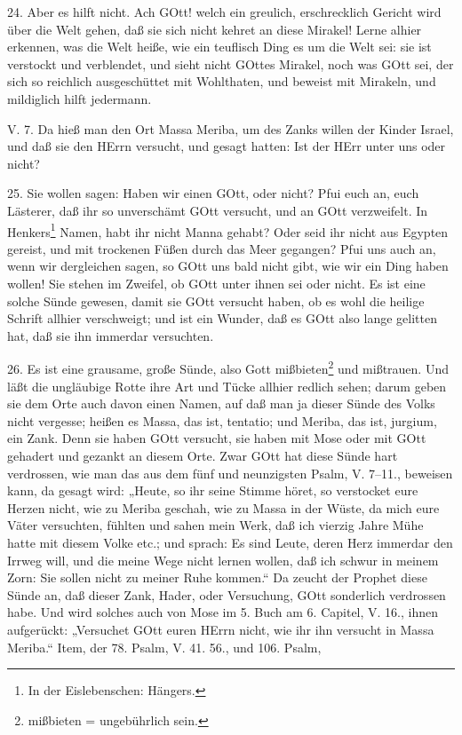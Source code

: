 24. Aber es hilft nicht. Ach GOtt! welch ein greulich, erschrecklich Gericht wird über die Welt gehen, daß sie sich nicht kehret an diese Mirakel! Lerne alhier erkennen, was die Welt heiße, wie ein teuflisch Ding es um die Welt sei: sie ist verstockt und verblendet, und sieht nicht GOttes Mirakel, noch was GOtt sei, der sich so reichlich ausgeschüttet mit Wohlthaten, und beweist mit Mirakeln, und mildiglich hilft jedermann.

\begin{schriftzitat}
V. 7. Da hieß man den Ort Massa Meriba, um des Zanks willen der Kinder Israel, und daß sie den HErrn versucht, und gesagt hatten: Ist der HErr unter uns oder nicht?
\end{schriftzitat}

25. Sie wollen sagen: Haben wir einen GOtt, oder nicht? Pfui euch an, euch Lästerer, daß ihr so unverschämt GOtt versucht, und an GOtt verzweifelt. In Henkers\footnote{In der Eislebenschen: Hängers.} Namen, habt ihr nicht Manna gehabt? Oder seid ihr nicht aus Egypten gereist, und mit trockenen Füßen durch das Meer gegangen? Pfui uns auch an, wenn wir dergleichen sagen, so GOtt uns bald nicht gibt, wie wir ein Ding haben wollen! Sie stehen im Zweifel, ob GOtt unter ihnen sei oder nicht. Es ist eine solche Sünde gewesen, damit sie GOtt versucht haben, ob es wohl die heilige Schrift allhier verschweigt; und ist ein Wunder, daß es GOtt also lange gelitten hat, daß sie ihn immerdar versuchten.

26. Es ist eine grausame, große Sünde, also Gott mißbieten\footnote{mißbieten = ungebührlich sein.} und mißtrauen. Und läßt die ungläubige Rotte ihre Art und Tücke allhier redlich sehen; darum geben sie dem Orte auch davon einen Namen, auf daß man ja dieser Sünde des Volks nicht vergesse; heißen es Massa, das ist, tentatio; und Meriba, das ist, jurgium, ein Zank. Denn sie haben GOtt versucht, sie haben mit Mose oder mit GOtt gehadert und gezankt an diesem Orte. Zwar GOtt hat diese Sünde hart verdrossen, wie man das aus dem fünf und neunzigsten Psalm, V. 7–11., beweisen kann, da gesagt wird: „Heute, so ihr seine Stimme höret, so verstocket eure Herzen nicht, wie zu Meriba geschah, wie zu Massa in der Wüste, da mich eure Väter versuchten, fühlten und sahen mein Werk, daß ich vierzig Jahre Mühe hatte mit diesem Volke etc.; und sprach: Es sind Leute, deren Herz immerdar den Irrweg will, und die meine Wege nicht lernen wollen, daß ich schwur in meinem Zorn: Sie sollen nicht zu meiner Ruhe kommen.“ Da zeucht der Prophet diese Sünde an, daß dieser Zank, Hader, oder Versuchung, GOtt sonderlich verdrossen habe. Und wird solches auch von Mose im 5. Buch am 6. Capitel, V. 16., ihnen aufgerückt: „Versuchet GOtt euren HErrn nicht, wie ihr ihn versucht in Massa Meriba.“ Item, der 78. Psalm, V. 41. 56., und 106. Psalm,

